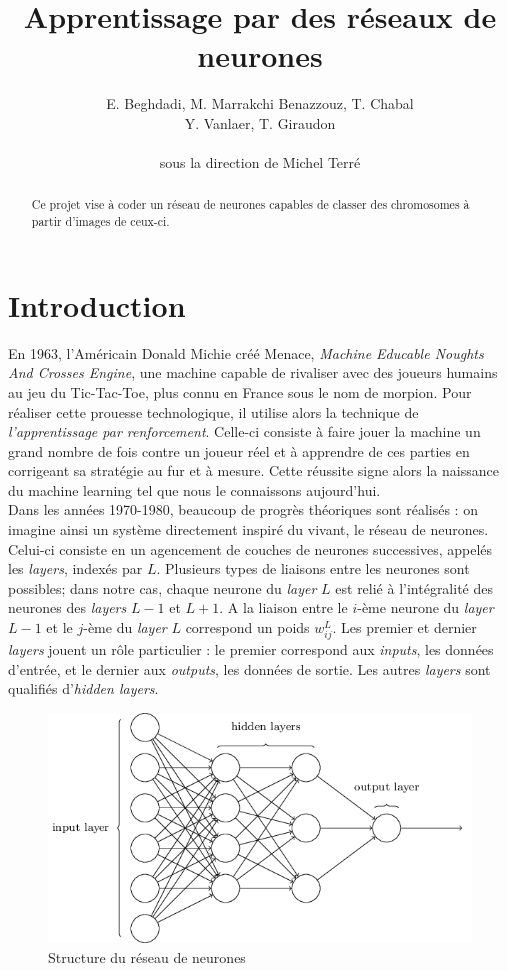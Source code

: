 \documentclass[a4paper,10pt]{article}
\title{Apprentissage par des réseaux de neurones}
\author{E. Beghdadi, M. Marrakchi Benazzouz, T. Chabal \\ Y. Vanlaer, T. Giraudon \\  \\ sous la direction de Michel Terré}
\begin{document}
\maketitle

\begin{abstract}
Ce projet vise à coder un réseau de neurones capables de classer des chromosomes à partir d'images de ceux-ci.

\end{abstract}

\section{Introduction}
En 1963, l'Américain Donald Michie créé Menace, \textit{Machine Educable Noughts And Crosses Engine},
une machine capable de rivaliser avec des joueurs humains au jeu du Tic-Tac-Toe, plus connu en France sous le nom de morpion.
Pour réaliser cette prouesse technologique, il utilise alors la technique de \textit{l'apprentissage par renforcement}.
Celle-ci consiste à faire jouer la machine un grand nombre de fois contre un joueur réel et à apprendre de ces parties
en corrigeant sa stratégie au fur et à mesure. Cette réussite signe alors la naissance du machine learning tel que
nous le connaissons aujourd'hui. \\
Dans les années 1970-1980, beaucoup de progrès théoriques sont réalisés : on imagine ainsi un système
directement inspiré du vivant, le réseau de neurones. Celui-ci consiste en un agencement de couches de neurones successives,
appelés les \textit{layers}, indexés par $L$. Plusieurs types de liaisons entre les neurones sont possibles; dans notre cas, chaque neurone du
\textit{layer} $L$ est relié à l'intégralité des neurones des \textit{layers} $L-1$ et $L+1$. A la liaison entre
le $i$-ème neurone du \textit{layer} $L-1$ et le $j$-ème du \textit{layer} $L$ correspond un poids $w^L_{ij}$. Les premier et dernier \textit{layers}
jouent un rôle particulier : le premier correspond aux \textit{inputs}, les données d'entrée, et le dernier aux \textit{outputs},
les données de sortie. Les autres \textit{layers} sont qualifiés d'\textit{hidden layers}.
\\

\begin{figure}[H]
\centering
\includegraphics[scale = 0.4]{layers}
\caption{Structure du réseau de neurones}
 
\end{figure}
\end{document}
